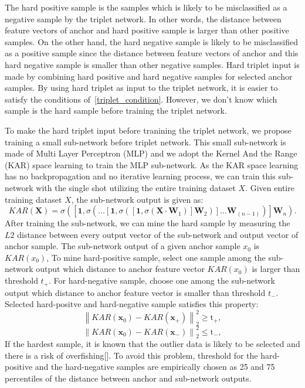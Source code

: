 The hard positive sample is the samples which is likely to be misclassified as a negative sample by the triplet network.
In other words, the distance between feature vectors of anchor and hard positive sample is larger than other positive samples.
On the other hand, the hard negative sample is likely to be misclassified as a positive sample since the distance between feature vectors of anchor and this hard negative sample is smaller than other negative samples.
Hard triplet input is made by combining hard positive and hard negative samples for selected anchor samples. By using hard triplet as input to the triplet network, it is easier to satisfy the conditions of~\ref{triplet_condition}. However, we don't know which sample is the hard sample before training the triplet network.

To make the hard triplet input before tranining the triplet network, we propose training a small sub-network before triplet network.
This small sub-network is made of Multi Layer Perceptron (MLP) and we adopt the Kernel And the Range (KAR) space learning to train the MLP sub-network. As the KAR space learning has no backpropagation and no iterative learning process, we can train this sub-network with the single shot utilizing the entire training dataset $X$. 
Given entire training dataset $X$, the sub-network output is given as: 
\begin{equation}
    KAR\left(\mathbf{X}\right)=\sigma\left(\left[\mathbf{1},\sigma\left(\dots\left[\mathbf{1},\sigma\left(\left[\mathbf{1},\sigma\left(\mathbf{X}\cdot\mathbf{W}_{1}\right)\right]\mathbf{W}_{2}\right)\right]\dots\mathbf{W}_{(n-1)}\right)\right]\mathbf{W}_{n}\right).
\end{equation}
After training the sub-network, we can mine the hard sample by measuring the $L2$ distance between every output vector of the sub-network and output vector of anchor sample.
The sub-network output of a given anchor sample $x_0$ is $KAR(x_0)$, To mine hard-positive sample, select one sample among the sub-network output which distance to anchor feature vector $KAR(x_0)$ is larger than threshold $t_+$. For hard-negative sample, choose one among the sub-network output which distance to anchor feature vector is smaller than threshold $t_-$.
Selected hard-positve and hard-negative sample satisfies this property:
\begin{equation}
    {\left\| {{KAR\left(\mathbf{x}_{0}\right)} - {KAR\left(\mathbf{x}_{+}\right)}} \right\|_2^2} \geq \mathrm{t}_{+}, 
    \label{thres_pos}
\end{equation}
\begin{equation}
    {\left\| {{KAR\left(\mathbf{x}_{0}\right)} - {KAR\left(\mathbf{x}_{-}\right)}} \right\|_2^2} \leq \mathrm{t}_{-},\label{thres_neg}
\end{equation}
If the hardest sample, it is known that the outlier data is likely to be selected and there is a risk of overfishing[].
To avoid this problem, threshold for the hard-positive and the hard-negative samples are empirically chosen as 25 and 75 percentiles of the distance between anchor and sub-network outputs.

